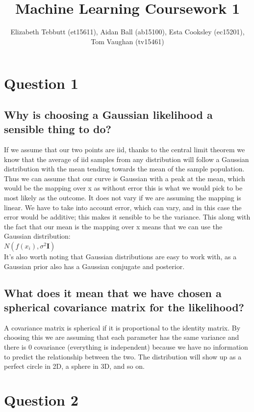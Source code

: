 \documentclass[a4paper, 9pt]{article}
\title{Machine Learning Coursework 1}
\author{
    Elizabeth Tebbutt (et15611), Aidan Ball (ab15100),
    \And Esta Cooksley (ec15201), Tom Vaughan (tv15461)
}
\begin{document}
\maketitle
\section*{Question 1}
\subsection*{Why is choosing a Gaussian likelihood a sensible thing to do?}
If we assume that our two points are iid, thanks to the central limit theorem we know that the average of iid samples from any distribution will follow a Gaussian distribution with the mean tending towards the mean of the sample population. Thus we can assume that our curve is Gaussian with a peak at the mean, which would be the mapping over x as without error this is what we would pick to be most likely as the outcome. It does not vary if we are assuming the mapping is linear. We have to take into account error, which can vary, and in this case the error would be additive; this makes it sensible to be the variance. This along with the fact that our mean is the mapping over x means that we can use the Gaussian distribution: \\

\( N(f(x_i), \sigma^2 \mathbf{I} ) \) \\

It's also worth noting that Gaussian distributions are easy to work with, as a Gaussian prior also has a Gaussian conjugate and posterior.
\subsection*{What does it mean that we have chosen a spherical covariance matrix for the likelihood?}
A covariance matrix is spherical if it is proportional to the identity matrix. By choosing this we are assuming that each parameter has the same variance and there is 0 covariance (everything is independent) because we have no information to predict the relationship between the two. The distribution will show up as a perfect circle in 2D, a sphere in 3D, and so on.

\section*{Question 2}
\end{document}
